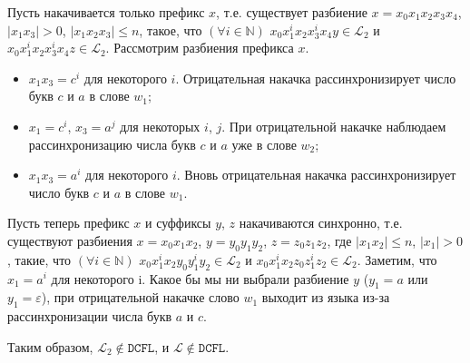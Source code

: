 \documentclass{article}
\begin{document}
Пусть накачивается только префикс $x$, т.е. существует разбиение $x = x_0 x_1 x_2 x_3
x_4$, $|x_1 x_3| > 0$, $|x_1 x_2 x_3| \le n$, такое, что $(\forall i \in
\mathbb{N})$ $x_0 x_1^i x_2 x_3^i x_4 y \in \mathcal{L}_2$ и $x_0 x_1^i x_2
x_3^i x_4 z \in \mathcal{L}_2$. Рассмотрим разбиения префикса $x$.
\begin{itemize}
  \item $x_1 x_3 = c^i$ для некоторого $i$. Отрицательная накачка
    рассинхронизирует число букв $c$ и $a$ в слове $w_1$;
  \item $x_1 = c^i$, $x_3 = a^j$ для некоторых $i$, $j$. При отрицательной
    накачке наблюдаем рассинхронизацию числа букв $c$ и $a$ уже в слове $w_2$;
  \item $x_1 x_3 = a^i$ для некоторого $i$. Вновь отрицательная накачка
    рассинхронизирует число букв $c$ и $a$ в слове $w_1$.
\end{itemize}
Пусть теперь префикс $x$ и суффиксы $y$, $z$ накачиваются синхронно, т.е.
существуют разбиения $x = x_0 x_1 x_2$, $y = y_0 y_1 y_2$, $z = z_0 z_1 z_2$,
где $|x_1 x_2| \le n$, $|x_1| > 0$, такие, что $(\forall i \in \mathbb{N})$
$x_0 x_1^i x_2 y_0 y_1^i y_2 \in \mathcal{L}_2$ и $x_0 x_1^i x_2 z_0 z_1^i z_2
\in \mathcal{L}_2$. Заметим, что $x_1 = a^i$ для некоторого i. Какое бы мы ни
выбрали разбиение $y$ ($y_1 = a$ или $y_1 = \varepsilon$), при отрицательной
накачке слово $w_1$ выходит из языка из-за рассинхронизации числа букв $a$ и
$c$.

Таким образом, $\mathcal{L}_2 \notin \mathtt{DCFL}$, и $\mathcal{L} \notin
\mathtt{DCFL}$.
\end{document}
